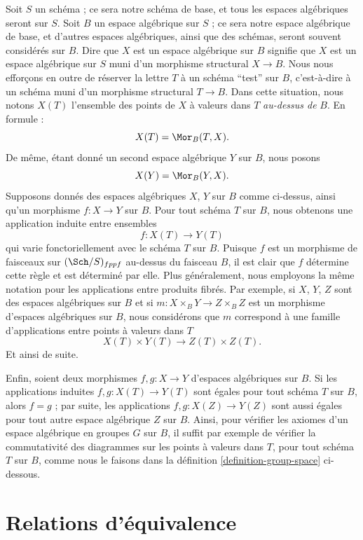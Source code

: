 \noindent
Soit $S$ un schéma ; ce sera notre schéma de base, et tous les espaces algébriques seront sur $S$. Soit $B$ un espace algébrique sur $S$ ; ce sera notre espace algébrique de base, et d'autres espaces algébriques, ainsi que des schémas, seront souvent considérés sur $B$. Dire que $X$ est un espace algébrique sur $B$ signifie que $X$ est un espace algébrique sur $S$ muni d'un morphisme structural $X \to B$. Nous nous efforçons en outre de réserver la lettre $T$ à un schéma ``test'' sur $B$, c'est-à-dire à un schéma muni d'un morphisme structural $T \to B$. Dans cette situation, nous notons $X(T)$ l'ensemble des points de $X$ à valeurs dans $T$ {\it au-dessus de} $B$. En formule :
$$
X(T) = \Mor_B(T, X).
$$
De même, étant donné un second espace algébrique $Y$ sur $B$, nous posons
$$
X(Y) = \Mor_B(Y, X).
$$
Supposons donnés des espaces algébriques $X$, $Y$ sur $B$ comme ci-dessus, ainsi qu'un morphisme $f : X \to Y$ sur $B$. Pour tout schéma $T$ sur $B$, nous obtenons une application induite entre ensembles
$$
f : X(T) \longrightarrow Y(T)
$$
qui varie fonctoriellement avec le schéma $T$ sur $B$. Puisque $f$ est un morphisme de faisceaux sur $(\Sch/S)_{fppf}$ au-dessus du faisceau $B$, il est clair que $f$ détermine cette règle et est déterminé par elle. Plus généralement, nous employons la même notation pour les applications entre produits fibrés. Par exemple, si $X$, $Y$, $Z$ sont des espaces algébriques sur $B$ et si $m : X \times_B Y \to Z \times_B Z$ est un morphisme d'espaces algébriques sur $B$, nous considérons que $m$ correspond à une famille d'applications entre points à valeurs dans $T$
$$
X(T) \times Y(T) \longrightarrow Z(T) \times Z(T).
$$
Et ainsi de suite.

\medskip\noindent
Enfin, soient deux morphismes $f, g : X \to Y$ d'espaces algébriques sur $B$. Si les applications induites $f, g : X(T) \to Y(T)$ sont égales pour tout schéma $T$ sur $B$, alors $f = g$ ; par suite, les applications $f, g : X(Z) \to Y(Z)$ sont aussi égales pour tout autre espace algébrique $Z$ sur $B$. Ainsi, pour vérifier les axiomes d'un espace algébrique en groupes $G$ sur $B$, il suffit par exemple de vérifier la commutativité des diagrammes sur les points à valeurs dans $T$, pour tout schéma $T$ sur $B$, comme nous le faisons dans la définition \ref{definition-group-space} ci-dessous.




\section{Relations d'équivalence}
\label{section-equivalence-relations}

